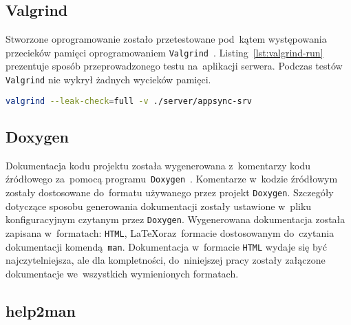 \documentclass[thesis]{subfiles}
\begin{document}

\subsection{Valgrind}

Stworzone oprogramowanie zostało przetestowane pod~kątem występowania przecieków pamięci oprogramowaniem \texttt{Valgrind}~\cite{valgrind}. Listing~\ref{lst:valgrind-run} prezentuje sposób przeprowadzonego testu na~aplikacji serwera. Podczas testów \texttt{Valgrind} nie wykrył żadnych wycieków pamięci.

\begin{lstlisting}[label=lst:valgrind-run,language=bash,numbers=none,caption={Uruchomienie \texttt{Valgrind} w~trybie wykrywania wszystkich dostępnych testów wycieków pamięci na~aplikacji serwera }]
valgrind --leak-check=full -v ./server/appsync-srv
\end{lstlisting}


\subsection{Doxygen}

Dokumentacja kodu projektu została wygenerowana z~komentarzy kodu źródłowego za~pomocą programu~\texttt{Doxygen}~\cite{doxygen}. Komentarze w~kodzie źródłowym zostały dostosowane do~formatu używanego przez projekt \texttt{Doxygen}. Szczegóły dotyczące sposobu generowania dokumentacji zostały ustawione w~pliku konfiguracyjnym  czytanym przez \texttt{Doxygen}. Wygenerowana dokumentacja została zapisana w~formatach: \texttt{HTML}, \LaTeX oraz~formacie dostosowanym do~czytania dokumentacji komendą~\texttt{man}. Dokumentacja w~formacie \texttt{HTML} wydaje się być najczytelniejsza, ale dla kompletności, do~niniejszej pracy zostały załączone dokumentacje we~wszystkich wymienionych formatach.

%
%


\subsection{help2man}
\end{document}
